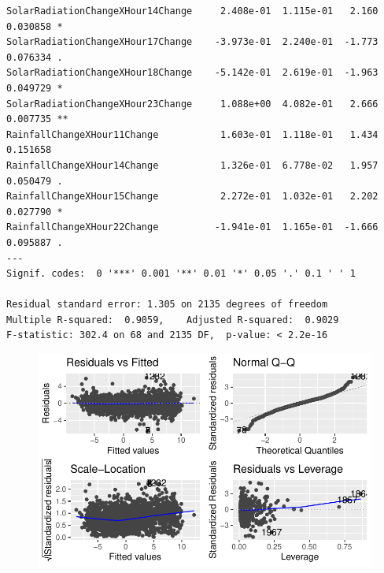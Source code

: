 \documentclass[
  letterpaper,
  DIV=11,
  numbers=noendperiod]{scrartcl}
\begin{document}
\begin{verbatim}
SolarRadiationChangeXHour14Change     2.408e-01  1.115e-01   2.160 0.030858 *  
SolarRadiationChangeXHour17Change    -3.973e-01  2.240e-01  -1.773 0.076334 .  
SolarRadiationChangeXHour18Change    -5.142e-01  2.619e-01  -1.963 0.049729 *  
SolarRadiationChangeXHour23Change     1.088e+00  4.082e-01   2.666 0.007735 ** 
RainfallChangeXHour11Change           1.603e-01  1.118e-01   1.434 0.151658    
RainfallChangeXHour14Change           1.326e-01  6.778e-02   1.957 0.050479 .  
RainfallChangeXHour15Change           2.272e-01  1.032e-01   2.202 0.027790 *  
RainfallChangeXHour22Change          -1.941e-01  1.165e-01  -1.666 0.095887 .  
---
Signif. codes:  0 '***' 0.001 '**' 0.01 '*' 0.05 '.' 0.1 ' ' 1

Residual standard error: 1.305 on 2135 degrees of freedom
Multiple R-squared:  0.9059,    Adjusted R-squared:  0.9029 
F-statistic: 302.4 on 68 and 2135 DF,  p-value: < 2.2e-16
\end{verbatim}

\begin{figure}[H]

{\centering \includegraphics{seoul_files/figure-pdf/unnamed-chunk-14-2.pdf}

}

\end{figure}
\end{document}
